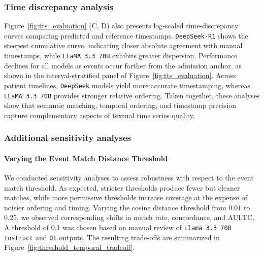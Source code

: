 \documentclass[pdflatex,sn-mathphys-num]{sn-jnl}%
\theoremstyle{thmstyleone}%
\theoremstyle{thmstyletwo}%
\theoremstyle{thmstylethree}%
\begin{document}
\subsubsection{Time discrepancy analysis}
Figure~\ref{fig:tts_evaluation} (C, D) also presents log-scaled time-discrepancy curves comparing predicted and reference timestamps. \texttt{DeepSeek-R1} shows the steepest cumulative curve, indicating closer absolute agreement with manual timestamps, while \texttt{LLaMA 3.3 70B} exhibits greater dispersion. Performance declines for all models as events occur farther from the admission anchor, as shown in the interval-stratified panel of Figure~\ref{fig:tts_evaluation}. Across patient timelines, \texttt{DeepSeek} models yield more accurate timestamping, whereas \texttt{LLaMA 3.3 70B} provides stronger relative ordering. Taken together, these analyses show that semantic matching, temporal ordering, and timestamp precision capture complementary aspects of textual time series quality.


\subsubsection{Additional sensitivity analyses}


\paragraph{Varying the Event Match Distance Threshold}
We conducted sensitivity analyses to assess robustness with respect to the event match threshold. As expected, stricter thresholds produce fewer but cleaner matches, while more permissive thresholds increase coverage at the expense of noisier ordering and timing. Varying the cosine distance threshold from 0.01 to 0.25, we observed corresponding shifts in match rate, concordance, and AULTC. A threshold of 0.1 was chosen based on manual review of \texttt{Llama 3.3 70B Instruct} and \texttt{O1} outputs. The resulting trade-offs are summarized in Figure~\ref{fig:threshold_temporal_tradeoff}.
\end{document}
